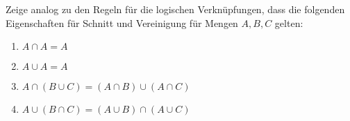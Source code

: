 \begin{exercise}
  Zeige analog zu den Regeln für die logischen Verknüpfungen, dass die folgenden
  Eigenschaften für Schnitt und Vereinigung für Mengen $A, B, C$ gelten:
  \begin{enumerate}
  \item $A \cap A = A$
  \item $A \cup A = A$
  \item $A \cap (B \cup C) = (A \cap B) \cup (A \cap C)$
  \item $A \cup (B \cap C) = (A \cup B) \cap (A \cup C)$
  \end{enumerate}
\end{exercise}
